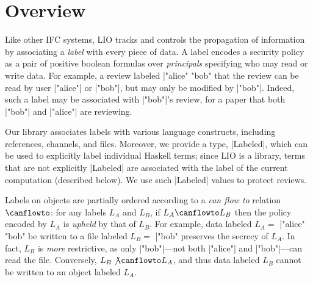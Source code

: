 \section{Overview}
\label{sec:overview}

Like other IFC systems, LIO tracks and controls the propagation of
information by associating a \emph{label} with every piece of
data.
%
A label encodes a security policy as a pair of positive boolean
formulas over \emph{principals} specifying who may read or write data.
%
For example, a review labeled \hs|"alice" \/ "bob" %
that the review can be read by user \hs|"alice"| or \hs|"bob"|, but
may only be modified by \hs|"bob"|.
%
Indeed, such a label may be associated with \hs|"bob"|'s review, for a
paper that both \hs|"bob"| and \hs|"alice"| are reviewing.
%

Our library associates labels with various language constructs,
including references, channels, and files.
%
Moreover, we provide a type, \hs|Labeled|, which can be used to
explicitly label individual Haskell terms; since LIO is a library,
terms that are not explicitly \hs|Labeled| are associated with the
label of the current computation (described below).
%
We use such \hs|Labeled| values to protect reviews.
%

Labels on objects are partially ordered according to a {\em can flow
  to} relation $\canflowto$: for any labels $L_A$ and $L_B$, if $L_A
  \canflowto L_B$ then the policy encoded by $L_A$ is \emph{upheld}
  by that of $L_B$.
%
For example, data labeled $L_A =$ \hs|"alice" \/ "bob" %
be written to a file labeled $L_B =$ \hs|"bob" %
preserves the secrecy of $L_A$.
%
In fact, $L_B$ is \emph{more} restrictive, as only
\hs|"bob"|---not both \hs|"alice"| and \hs|"bob"|---can read the file.
%
Conversely, $L_B \not\canflowto L_A$, and thus data labeled $L_B$
cannot be written to an object labeled $L_A$.

